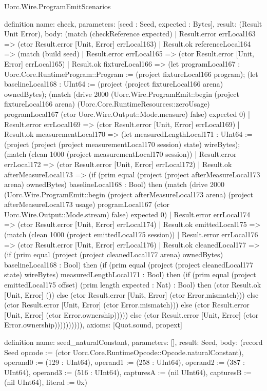 \begin{lexlean}{Uorc.Wire.ProgramEmitScenarios}
\begin{semanticmodule}
definition{
  name: check,
  parameters: [seed : Seed, expected : Bytes],
  result: (Result Unit Error),
  body: (match (checkReference expected)
    | Result.error errLocal163 => (ctor Result.error [Unit, Error] errLocal163)
    | Result.ok referenceLocal164 => (match (build seed)
      | Result.error errLocal165 => (ctor Result.error [Unit, Error] errLocal165)
      | Result.ok fixtureLocal166 => (let programLocal167 : Uorc.Core.RuntimeProgram::Program := (project fixtureLocal166 program); (let baselineLocal168 : UInt64 := (project (project fixtureLocal166 arena) ownedBytes); (match (drive 2000 (Uorc.Wire.ProgramEmit::begin (project fixtureLocal166 arena) (Uorc.Core.RuntimeResources::zeroUsage) programLocal167 (ctor Uorc.Wire.Output::Mode.measure) false) expected 0)
        | Result.error errLocal169 => (ctor Result.error [Unit, Error] errLocal169)
        | Result.ok measurementLocal170 => (let measuredLengthLocal171 : UInt64 := (project (project (project measurementLocal170 session) state) wireBytes); (match (clean 1000 (project measurementLocal170 session))
          | Result.error errLocal172 => (ctor Result.error [Unit, Error] errLocal172)
          | Result.ok afterMeasureLocal173 => (if (prim equal (project (project afterMeasureLocal173 arena) ownedBytes) baselineLocal168 : Bool) then (match (drive 2000 (Uorc.Wire.ProgramEmit::begin (project afterMeasureLocal173 arena) (project afterMeasureLocal173 usage) programLocal167 (ctor Uorc.Wire.Output::Mode.stream) false) expected 0)
            | Result.error errLocal174 => (ctor Result.error [Unit, Error] errLocal174)
            | Result.ok emittedLocal175 => (match (clean 1000 (project emittedLocal175 session))
              | Result.error errLocal176 => (ctor Result.error [Unit, Error] errLocal176)
              | Result.ok cleanedLocal177 => (if (prim equal (project (project cleanedLocal177 arena) ownedBytes) baselineLocal168 : Bool) then (if (prim equal (project (project cleanedLocal177 state) wireBytes) measuredLengthLocal171 : Bool) then (if (prim equal (project emittedLocal175 offset) (prim length expected : Nat) : Bool) then (ctor Result.ok [Unit, Error] ()) else (ctor Result.error [Unit, Error] (ctor Error.mismatch))) else (ctor Result.error [Unit, Error] (ctor Error.mismatch))) else (ctor Result.error [Unit, Error] (ctor Error.ownership))))) else (ctor Result.error [Unit, Error] (ctor Error.ownership)))))))))),
  axioms: [Quot.sound, propext]
}

definition{
  name: seed_naturalConstant,
  parameters: [],
  result: Seed,
  body: (record Seed {opcode := (ctor Uorc.Core.RuntimeOpcode::Opcode.naturalConstant), operand0 := (129 : UInt64), operand1 := (258 : UInt64), operand2 := (387 : UInt64), operand3 := (516 : UInt64), capturesA := (nil UInt64), capturesB := (nil UInt64), literal := 0x})
}


\end{semanticmodule}
\end{lexlean}
